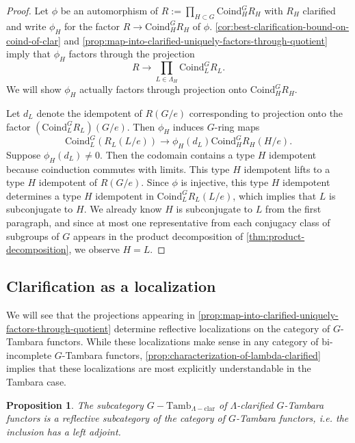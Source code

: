 \documentclass[11pt,dvipsnames]{amsart}
\newtheorem{proposition}[theorem]{Proposition}
\theoremstyle{BoldRemark}
\newcommand{\Tamb}{\mathrm{Tamb}}
\begin{document}
\begin{proof}
	Let $\phi$ be an automorphism of $R := \prod_{H \subset G} \mathrm{Coind}_H^G R_H$ with $R_H$ clarified and write $\phi_H$ for the factor $R \rightarrow \mathrm{Coind}_H^G R_H$ of $\phi$. \cref{cor:best-clarification-bound-on-coind-of-clar} and \cref{prop:map-into-clarified-uniquely-factors-through-quotient} imply that $\phi_H$ factors through the projection \[ R \rightarrow \prod_{L \in \Lambda_H} \mathrm{Coind}_L^G R_L . \] We will show $\phi_H$ actually factors through projection onto $\mathrm{Coind}_H^G R_H$. 
	
	Let $d_L$ denote the idempotent of $R(G/e)$ corresponding to projection onto the factor $( \mathrm{Coind}_L^G R_L )(G/e)$. Then $\phi_H$ induces $G$-ring maps \[ \mathrm{Coind}_L^G (R_L(L/e)) \rightarrow \phi_H(d_L) \mathrm{Coind}_H^G R_H(H/e) . \] Suppose $\phi_H(d_L) \neq 0$. Then the codomain contains a type $H$ idempotent because coinduction commutes with limits. This type $H$ idempotent lifts to a type $H$ idempotent of $R(G/e)$. Since $\phi$ is injective, this type $H$ idempotent determines a type $H$ idempotent in $\mathrm{Coind}_L^G R_L(L/e)$, which implies that $L$ is subconjugate to $H$. We already know $H$ is subconjugate to $L$ from the first paragraph, and since at most one representative from each conjugacy class of subgroups of $G$ appears in the product decomposition of \cref{thm:product-decomposition}, we observe $H = L$.
\end{proof}

\subsection{Clarification as a localization}

We will see that the projections appearing in \cref{prop:map-into-clarified-uniquely-factors-through-quotient} determine reflective localizations on the category of $G$-Tambara functors. While these localizations make sense in any category of bi-incomplete $G$-Tambara functors, \cref{prop:characterization-of-lambda-clarified} implies that these localizations are most explicitly understandable in the Tambara case.

\begin{proposition}
	The subcategory $G {-} \Tamb_{\Lambda {-} \mathrm{clar}}$ of $\Lambda$-clarified $G$-Tambara functors is a reflective subcategory of the category of $G$-Tambara functors, i.e. the inclusion has a left adjoint.
\end{proposition}
\end{document}

